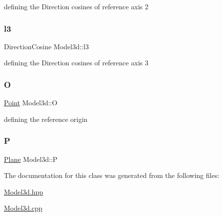 defining the Direction cosines of reference axis 2 

\mbox{\label{class_model3d_a55a8acbf54092ba872e2ba06f719f9a5}} 
\subsubsection{\texorpdfstring{l3}{l3}}
{\footnotesize\ttfamily Direction\+Cosine Model3d\+::l3}



defining the Direction cosines of reference axis 3 

\mbox{\label{class_model3d_a0b3566bc28cf3f7db521492d701ffc40}} 
\subsubsection{\texorpdfstring{O}{O}}
{\footnotesize\ttfamily \mbox{\hyperlink{class_point}{Point}} Model3d\+::O}



defining the reference origin 

\mbox{\label{class_model3d_ab7f731b1e8f73853a6c20128789df465}} 
\subsubsection{\texorpdfstring{P}{P}}
{\footnotesize\ttfamily \mbox{\hyperlink{class_plane}{Plane}} Model3d\+::P}



The documentation for this class was generated from the following files\+:\begin{DoxyCompactItemize}
\item 
\mbox{\hyperlink{_model3d_8hpp}{Model3d.\+hpp}}\item 
\mbox{\hyperlink{_model3d_8cpp}{Model3d.\+cpp}}\end{DoxyCompactItemize}
